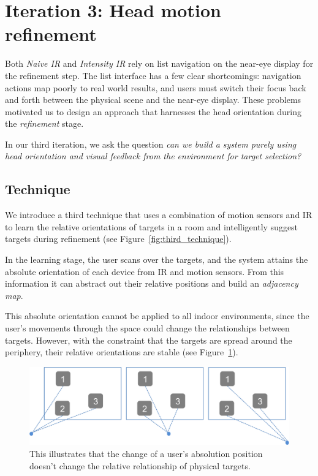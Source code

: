 \section{Iteration 3: Head motion refinement}
\label{sec:iteration-3:-head}

Both {\em Naive IR} and {\em Intensity IR} rely on list navigation on the
near-eye display for the refinement step. The list interface has a few clear
shortcomings: navigation actions map poorly to real world results, and
users must switch their focus back and forth between the physical scene and the
near-eye display. These problems motivated us to design an approach that
harnesses the head orientation during the {\em refinement} stage.

In our third iteration, we ask the question {\em can we build a system purely
using head orientation and visual feedback from the environment for target
selection?}

\subsection{Technique}

We introduce a third technique that uses a combination of motion sensors and IR
to learn the relative orientations of targets in a room and intelligently
suggest targets during refinement (see Figure~\ref{fig:third_technique}).

In the learning stage, the user scans over the targets, and the system attains
the absolute orientation of each device from IR and motion sensors. From this
information it can abstract out their relative positions and build an {\em
adjacency map}.

This absolute orientation cannot be applied to all indoor environments, since
the user’s movements through the space could change the relationships between
targets. However, with the constraint that the targets are spread around the
periphery, their relative orientations are stable (see
Figure~\ref{fig:third_principle}).

\begin{figure}[t]
\centering
\includegraphics[width=1\columnwidth]{figures/third_principle.png}
\caption{This illustrates that the change of a user's absolution position
doesn't change the relative relationship of physical targets.}
\label{fig:third_principle}
\end{figure}

